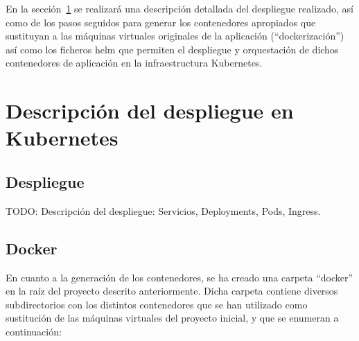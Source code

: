 \documentclass[12pt,spanish]{article}
\begin{document}
En la sección~\ref{sec:deployment} se realizará una descripción detallada del despliegue realizado, así como de los pasos seguidos para generar los contenedores apropiados que sustituyan a las máquinas virtuales originales de la aplicación (``dockerización'') así como los ficheros helm que permiten el despliegue y orquestación de dichos contenedores de aplicación en la infraestructura Kubernetes.

\section{Descripción del despliegue en Kubernetes}
\label{sec:deployment}

\subsection{Despliegue}

TODO: Descripción del despliegue: Servicios, Deployments, Pods, Ingress.

\subsection{Docker}

En cuanto a la generación de los contenedores, se ha creado una carpeta ``docker'' en la raíz del proyecto descrito anteriormente. Dicha carpeta contiene diversos subdirectorios con los distintos contenedores que se han utilizado como sustitución de las máquinas virtuales del proyecto inicial, y que se enumeran a continuación:
\end{document}
